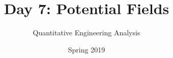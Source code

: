\documentclass{tufte-handout}
\title{Day 7: Potential Fields}
\author{Quantitative Engineering Analysis}
\date{Spring 2019}
\begin{document}
%
%
%
%
%
\newcommand{\V}{\mathbf{V}}
\newcommand{\F}{\mathbf{F}}
\renewcommand{\v}{\mathbf{v}}
\renewcommand{\t}{\mathbf{t}}
\renewcommand{\u}{\mathbf{u}}
\renewcommand{\r}{\mathbf{r}}
\renewcommand{\a}{\mathbf{a}}
\newcommand{\rhat}{\hat{\mathbf{r}}}
\end{document}
